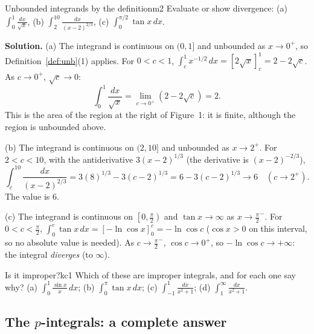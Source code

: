 \documentclass[11pt]{article}
\begin{document}
\begin{exmp}{Unbounded integrands by the definition}{m2}
Evaluate or show divergence: (a) $\displaystyle\int_0^1\frac{dx}{\sqrt x}$, \quad (b) $\displaystyle\int_2^{10}\frac{dx}{(x-2)^{2/3}}$, \quad (c) $\displaystyle\int_0^{\pi/2}\tan x\,dx$.

\textbf{Solution.} (a) The integrand is continuous on $(0,1]$ and unbounded as $x\to0^+$, so Definition~\ref{def:unb}(1) applies. For $0<c<1$, $\int_c^1x^{-1/2}\,dx=\left[2\sqrt x\right]_c^1=2-2\sqrt c$. As $c\to0^+$, $\sqrt c\to0$:
\[\int_0^1\frac{dx}{\sqrt x}=\lim_{c\to0^+}\left(2-2\sqrt c\right)=2 .\]
This is the area of the region at the right of Figure~1: it is finite, although the region is unbounded above.

(b) The integrand is continuous on $(2,10]$ and unbounded as $x\to2^+$. For $2<c<10$, with the antiderivative $3(x-2)^{1/3}$ (the derivative is $(x-2)^{-2/3}$),
\[\int_c^{10}\frac{dx}{(x-2)^{2/3}}=3(8)^{1/3}-3(c-2)^{1/3}=6-3(c-2)^{1/3}\longrightarrow6\quad(c\to2^+).\]
The value is $6$.

(c) The integrand is continuous on $\left[0,\frac\pi2\right)$ and $\tan x\to\infty$ as $x\to\frac\pi2^-$. For $0<c<\frac\pi2$, $\int_0^c\tan x\,dx=\left[-\ln\cos x\right]_0^c=-\ln\cos c$ ($\cos x>0$ on this interval, so no absolute value is needed). As $c\to\frac\pi2^-$, $\cos c\to0^+$, so $-\ln\cos c\to+\infty$: the integral \emph{diverges} (to $\infty$).
\end{exmp}

\begin{kc}{Is it improper?}{kc1}
Which of these are improper integrals, and for each one say why? (a) $\displaystyle\int_0^1\frac{\sin x}x\,dx$; \quad (b) $\displaystyle\int_0^\pi\tan x\,dx$; \quad (c) $\displaystyle\int_{-1}^1\frac{dx}{x^2+1}$; \quad (d) $\displaystyle\int_1^\infty\frac{dx}{x^2+1}$.
\end{kc}

\subsection*{The $p$-integrals: a complete answer}
\end{document}
